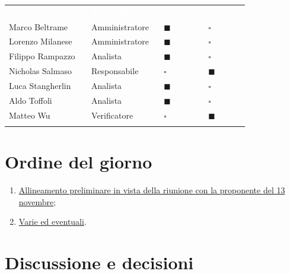 \documentclass[12pt,a4paper]{article}
\newcommand{\tightlist}{\setlength{\itemsep}{1pt}\setlength{\parskip}{0pt}}
\begin{document}
\begin{center}
\begin{tabularx}{\linewidth}{>{\raggedright\arraybackslash}X>{\centering\arraybackslash}X>{\centering\arraybackslash}p{2.2cm}>{\centering\arraybackslash}p{2.2cm}}
\rowcolor{bfblue}\textcolor{white}{\textbf{Nome e Cognome}} & \textcolor{white}{\textbf{Ruolo Progetto}} & \textcolor{white}{\textbf{Presente}} & \textcolor{white}{\textbf{Assente}} \\
Marco Beltrame & Amministratore & $\blacksquare$ & $\square$ \\ \arrayrulecolor{bfline}\hline
Lorenzo Milanese & Amministratore & $\blacksquare$ & $\square$ \\ \arrayrulecolor{bfline}\hline
Filippo Rampazzo & Analista & $\blacksquare$ & $\square$ \\ \arrayrulecolor{bfline}\hline
Nicholas Salmaso & Responsabile & $\square$ & $\blacksquare$ \\ \arrayrulecolor{bfline}\hline
Luca Stangherlin & Analista & $\blacksquare$ & $\square$ \\ \arrayrulecolor{bfline}\hline
Aldo Toffoli & Analista & $\blacksquare$ & $\square$ \\ \arrayrulecolor{bfline}\hline
Matteo Wu & Verificatore & $\square$ & $\blacksquare$ \\ \arrayrulecolor{bfline}\hline
\end{tabularx}
\end{center}

\hypertarget{ordine-del-giorno}{%
\section{Ordine del giorno}}

\begin{enumerate}
\tightlist
\item \hyperlink{odg-1}{Allineamento preliminare in vista della riunione con la proponente del 13 novembre};
\item \hyperlink{varie-ed-eventuali}{Varie ed eventuali}.
\end{enumerate}


\newpage
\hypertarget{discussione-e-decisioni}{%
\section{Discussione e decisioni}}
\end{document}
